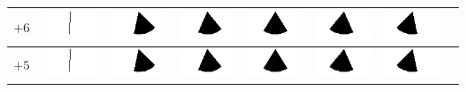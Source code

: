 \begin{tabular}{|c|c|c|c|c|c|c|c|}
	\hline
	$+6$ &
	\includegraphics[width=0.045\linewidth]{img_Bereich/V1_vid_Winkel_X_-3000_5000.png}&
	\includegraphics[width=0.045\linewidth]{img_Bereich/V1_vid_Winkel_X_-2000_5000.png}&
	\includegraphics[width=0.045\linewidth]{img_Bereich/V1_vid_Winkel_X_-1000_5000.png}&
	\includegraphics[width=0.045\linewidth]{img_Bereich/V1_vid_Winkel_X_0_5000.png}&
	\includegraphics[width=0.045\linewidth]{img_Bereich/V1_vid_Winkel_X_1000_5000.png}&
	\includegraphics[width=0.045\linewidth]{img_Bereich/V1_vid_Winkel_X_2000_5000.png}&\\ 
	\hline 
	$+5$ &
	\includegraphics[width=0.045\linewidth]{img_Bereich/V1_vid_Winkel_X_-3000_5000.png}&
	\includegraphics[width=0.045\linewidth]{img_Bereich/V1_vid_Winkel_X_-2000_5000.png}&
	\includegraphics[width=0.045\linewidth]{img_Bereich/V1_vid_Winkel_X_-1000_5000.png}&
	\includegraphics[width=0.045\linewidth]{img_Bereich/V1_vid_Winkel_X_0_5000.png}&
	\includegraphics[width=0.045\linewidth]{img_Bereich/V1_vid_Winkel_X_1000_5000.png}&
	\includegraphics[width=0.045\linewidth]{img_Bereich/V1_vid_Winkel_X_2000_5000.png}&\\ 

\end{tabular}
